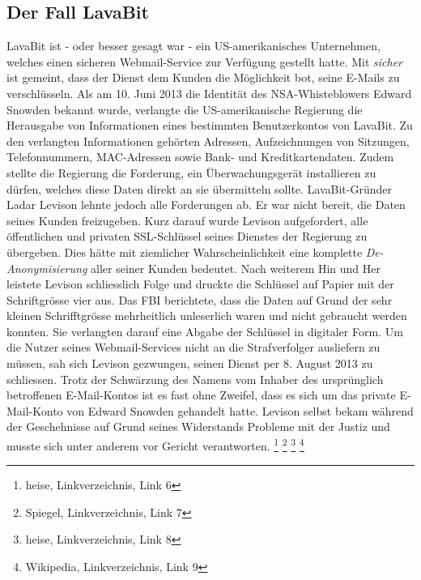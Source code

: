 \subsection{Der Fall LavaBit}
LavaBit ist - oder besser gesagt war - ein US-amerikanisches Unternehmen, welches einen sicheren Webmail-Service zur Verfügung gestellt hatte. Mit \textit{sicher} ist gemeint, dass der Dienst dem Kunden die Möglichkeit bot, seine E-Mails zu verschlüsseln. Als am 10. Juni 2013 die Identität des NSA-Whisteblowers Edward Snowden bekannt wurde, verlangte die US-amerikanische Regierung die Herausgabe von Informationen eines bestimmten Benutzerkontos von LavaBit. Zu den verlangten Informationen gehörten Adressen, Aufzeichnungen von Sitzungen, Telefonnummern, MAC-Adressen sowie Bank- und Kreditkartendaten. Zudem stellte die Regierung die Forderung, ein Überwachungsgerät installieren zu dürfen, welches diese Daten direkt an sie übermitteln sollte. LavaBit-Gründer Ladar Levison lehnte jedoch alle Forderungen ab. Er war nicht bereit, die Daten seines Kunden freizugeben. Kurz darauf wurde Levison aufgefordert, alle öffentlichen und privaten SSL-Schlüssel seines Dienstes der Regierung zu übergeben. Dies hätte mit ziemlicher Wahrscheinlichkeit eine komplette \textit{De-Anonymisierung} aller seiner Kunden bedeutet. Nach weiterem Hin und Her leistete Levison schliesslich Folge und druckte die Schlüssel auf Papier mit der Schriftgrösse vier aus. Das FBI berichtete, dass die Daten auf Grund der sehr kleinen Schrifftgrösse mehrheitlich unleserlich waren und nicht gebraucht werden konnten. Sie verlangten darauf eine Abgabe der Schlüssel in digitaler Form. Um die Nutzer seines Webmail-Services nicht an die Strafverfolger ausliefern zu müssen, sah sich Levison gezwungen, seinen Dienst per 8. August 2013 zu schliessen. Trotz der Schwärzung des Namens vom Inhaber des ursprünglich betroffenen E-Mail-Kontos ist es fast ohne Zweifel, dass es sich um das private E-Mail-Konto von Edward Snowden gehandelt hatte. Levison selbst bekam während der Geschehnisse auf Grund seines Widerstands Probleme mit der Justiz und musste sich unter anderem vor Gericht verantworten.
\footnote{heise, Linkverzeichnis, Link 6}
\footnote{Spiegel, Linkverzeichnis, Link 7}
\footnote{heise, Linkverzeichnis, Link 8}
\footnote{Wikipedia, Linkverzeichnis, Link 9}

